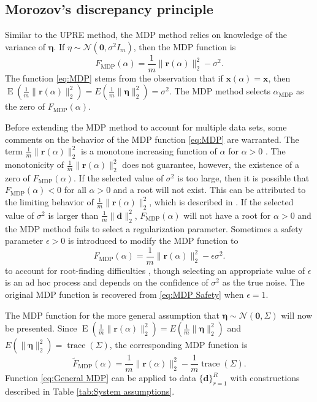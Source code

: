 \documentclass[12pt]{article}
\newcommand{\mA}{m}	%
\newcommand{\dVec}{\mathbf{d}}	%
\newcommand{\rVec}{\mathbf{r}}	%
\newcommand{\xVec}{\mathbf{x}}	%
\DeclareMathOperator{\trace}{trace}		%
\newcommand{\regparam}{\alpha}  %
\newcommand{\xReg}{\xVec(\regparam)}	%
\newcommand{\noise}{\eta}	%
\newcommand{\noiseSD}{\sigma}	%
\newcommand{\noiseVec}{\bm{\noise}}	%
\DeclareMathOperator{\E}{E}	%
\newcommand{\zeroVec}{\bm{0}}	%
\newcommand{\D}{F_{\text{MDP}}}	%
\newcommand{\safeparam}{\epsilon}	%
\newcommand{\DBig}{\widetilde{F}_{\text{MDP}}}	%
\begin{document}
\subsection{Morozov's discrepancy principle} \label{sec:MDP}
Similar to the UPRE method, the MDP method relies on knowledge of the variance of $\noiseVec$. If $\noise \sim \mathcal{N}(\bm{0},\noiseSD^2 I_{\mA})$, then the MDP function is 
\begin{equation}
\label{eq:MDP}
\D(\regparam) = \frac{1}{\mA}\|\rVec(\regparam)\|_2^2 - \noiseSD^2.
\end{equation}
The function \eqref{eq:MDP} stems from the observation that if $\xReg = \xVec$, then $\E(\frac{1}{\mA}\|\rVec(\regparam)\|_2^2) = E(\frac{1}{\mA}\|\noiseVec\|_2^2) = \noiseSD^2$. The MDP method selects $\regparam_{\text{MDP}}$ as the zero of $\D(\regparam)$.  \par 
Before extending the MDP method to account for multiple data sets, some comments on the behavior of the MDP function \eqref{eq:MDP} are warranted. The term $\frac{1}{\mA}\|\rVec(\regparam)\|_2^2$ is a monotone increasing function of $\regparam$ for $\regparam > 0$ \cite{Vogel:2002}. The monotonicity of $\frac{1}{\mA}\|\rVec(\regparam)\|_2^2$ does not guarantee, however, the existence of a zero of $\D(\regparam)$. If the selected value of $\noiseSD^2$ is too large, then it is possible that $\D(\regparam) < 0$ for all $\regparam > 0$ and a root will not exist. This can be attributed to the limiting behavior of $\frac{1}{\mA}\|\rVec(\regparam)\|_2^2$, which is described in \cite{Byrne}. If the selected value of $\noiseSD^2$ is larger than $\frac{1}{\mA}\|\dVec\|_2^2$, $\D(\regparam)$ will not have a root for $\regparam > 0$ and the MDP method fails to select a regularization parameter. Sometimes a safety parameter $\safeparam > 0$ is introduced to modify the MDP function to
\begin{equation}
\label{eq:MDP Safety}
\D(\regparam) = \frac{1}{\mA}\|\rVec(\regparam)\|_2^2 - \safeparam\noiseSD^2.
\end{equation}
to account for root-finding difficulties \cite{ABT,IRTools}, though selecting an appropriate value of $\safeparam$ is an ad hoc process and depends on the confidence of $\noiseSD^2$ as the true noise. The original MDP function is recovered from \eqref{eq:MDP Safety} when $\safeparam = 1$. \par
The MDP function for the more general assumption that $\noiseVec \sim \mathcal{N}(\zeroVec,\Sigma)$ will now be presented. Since $\E(\frac{1}{\mA}\|\rVec(\regparam)\|_2^2) = E(\frac{1}{\mA}\|\noiseVec\|_2^2)$ and $E(\|\noiseVec\|_2^2) = \trace(\Sigma)$, the corresponding MDP function is
\begin{equation}
\label{eq:General MDP}
\DBig(\regparam) = \frac{1}{\mA}\|\rVec(\regparam)\|_2^2 - \frac{1}{\mA}\trace\left(\Sigma\right).
\end{equation}
Function \eqref{eq:General MDP} can be applied to data $\{\dVec\}_{r=1}^R$ with constructions described in Table \ref{tab:System assumptions}. 
\end{document}
